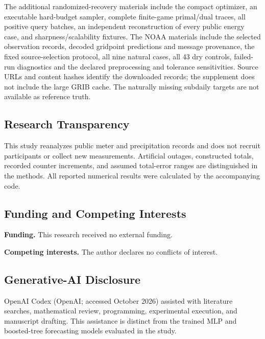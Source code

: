 \documentclass[12pt]{article}
\begin{document}
The additional randomized-recovery materials include the compact optimizer,
an executable hard-budget sampler, complete finite-game primal/dual traces,
all positive query batches, an independent reconstruction of every public
energy case, and sharpness/scalability fixtures. The NOAA materials include
the selected observation records, decoded gridpoint predictions and message
provenance, the fixed source-selection protocol, all nine natural cases,
all 43 dry controls, failed-run diagnostics and the declared preprocessing
and tolerance sensitivities. Source URLs and content hashes identify the
downloaded records; the supplement does not include the large GRIB cache.
The naturally missing subdaily targets are not available as reference truth.

\subsection*{Research Transparency}
This study reanalyzes public meter and precipitation records and does not recruit participants
or collect new measurements. Artificial outages, constructed totals,
recorded counter increments, and assumed total-error ranges are distinguished
in the methods. All reported numerical results were calculated by the
accompanying code.

\subsection*{Funding and Competing Interests}
\textbf{Funding.} This research received no external funding.

\textbf{Competing interests.} The author declares no conflicts of interest.

\subsection*{Generative-AI Disclosure}
OpenAI Codex (OpenAI; accessed October 2026) assisted with literature
searches, mathematical review, programming, experimental execution, and
manuscript drafting. This assistance is distinct from the trained MLP and
boosted-tree forecasting models evaluated in the study.
\end{document}
